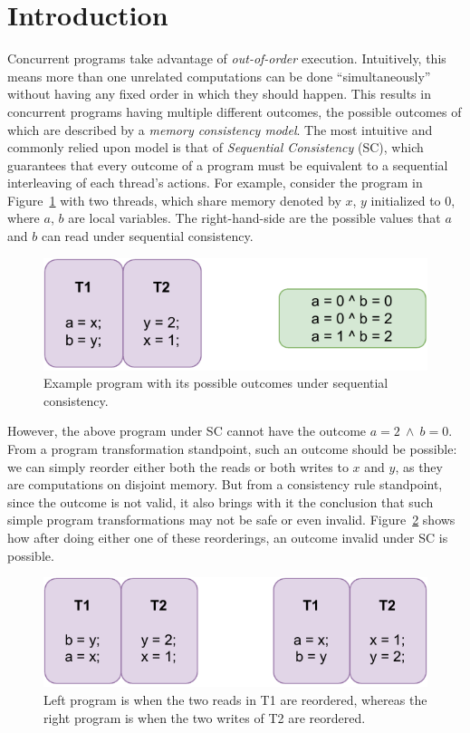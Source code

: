 \section{Introduction} 
    Concurrent programs take advantage of \textit{out-of-order} execution. Intuitively, this means more than one unrelated computations can be done ``simultaneously'' without having any fixed order in which they should happen. 
    This results in concurrent programs having multiple different outcomes, the possible outcomes of which are described by
    a \textit{memory consistency model}. 
    The most intuitive and commonly relied upon model is that of \textit{Sequential Consistency} (SC), which guarantees that every outcome of a program must be equivalent to a sequential interleaving of each thread's actions. 
    For example, consider the program in Figure~\ref{intro:Example} with two threads, which share memory denoted by $x$, $y$ initialized to 0, where $a$, $b$ are local variables. The right-hand-side are the possible values that $a$ and $b$ can read under sequential consistency.
    
    \begin{figure}[H]
        \centering
        \includegraphics[scale=0.7]{Program_Example.pdf}
        \caption{Example program with its possible outcomes under sequential consistency.}
        \label{intro:Example}
    \end{figure}
    
    
    However, the above program under SC cannot have the outcome $a=2\ \wedge\ b=0$. 
    From a program transformation standpoint, such an outcome should be possible: we can simply reorder either both the reads or both writes to $x$ and $y$, as they are computations on disjoint memory. 
    But from a consistency rule standpoint, since the outcome is not valid, it also brings with it the conclusion that such simple program transformations may not be safe or even invalid.
    Figure~\ref{intro:Example2} shows how after doing either one of these reorderings, an outcome invalid under SC is possible. 
    \begin{figure}[H]
        \centering
        \includegraphics[scale=0.7]{Program_Transform_Example.pdf}
        \caption{Left program is when the two reads in T1 are reordered, whereas the right program is when the two writes of T2 are reordered.}
        \label{intro:Example2}
    \end{figure}
    
